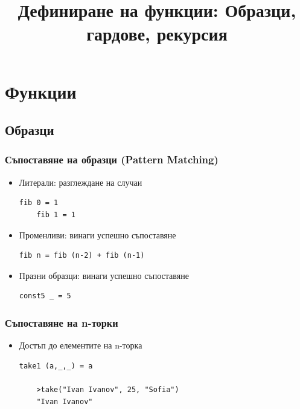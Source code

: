 \documentclass{beamer}
\begin{document}
\title[Увод в курса]{Дефиниране на функции: Образци, гардове, рекурсия}
\frame{\titlepage}

\section{Функции}
\subsection{Образци}


\begin{frame}[fragile]
  \frametitle{Съпоставяне на образци (Pattern Matching)}

\begin{itemize}
  \item Литерали: разглеждане на случаи
  \begin{lstlisting}[basicstyle=\small]
    fib 0 = 1
    fib 1 = 1 
  \end{lstlisting}
  \item Променливи: винаги успешно съпоставяне
  \begin{lstlisting}[basicstyle=\small]
    fib n = fib (n-2) + fib (n-1)
  \end{lstlisting}
  \item Празни образци: винаги успешно съпоставяне
  \begin{lstlisting}[basicstyle=\small]
    const5 _ = 5
  \end{lstlisting}
\end{itemize}

\end{frame}


\begin{frame}[fragile]
  \frametitle{Съпоставяне на n-торки}

\begin{itemize}
  \item Достъп до елементите на n-торка
  \begin{lstlisting}[basicstyle=\small]
    take1 (a,_,_) = a

    >take("Ivan Ivanov", 25, "Sofia")
    "Ivan Ivanov"
  \end{lstlisting}
\end{itemize}

\end{frame}
\end{document}
